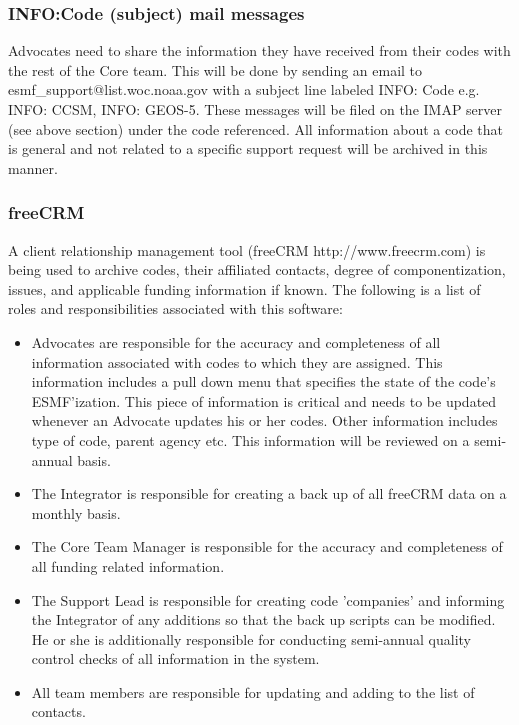 \subsubsection{INFO:Code (subject) mail messages}
\label{infomail}

Advocates need to share the information they have received from their codes with the rest 
of the Core team. This will be done by sending an email to esmf\_support@list.woc.noaa.gov with a 
subject line labeled INFO: Code e.g. INFO: CCSM, INFO: GEOS-5. These messages will be 
filed on the IMAP server (see above section) under the code referenced. All information 
about a code that is general and not related to a specific support request will be archived 
in this manner. 

\subsubsection{freeCRM}
A client relationship management tool (freeCRM http://www.freecrm.com) is being used 
to archive codes, their affiliated contacts, degree of componentization, issues, and 
applicable funding information if known. The following is a list of roles and 
responsibilities associated with this software:
\begin{itemize}
\item Advocates are responsible for the accuracy and completeness of all information 
associated with codes to which they are assigned.  This information includes a pull 
down menu that specifies the state of the code's ESMF'ization. This piece of 
information is critical and needs to be updated whenever an Advocate updates his or 
her codes. Other information includes type of code, parent agency etc. This 
information will be reviewed on a semi-annual basis. 
\item The Integrator is responsible for creating a back up of all freeCRM data on a 
monthly basis.
\item The Core Team Manager is responsible for the accuracy and completeness of all 
funding related information.
\item The Support Lead is responsible for creating code 'companies' and informing 
the Integrator of any additions so that the back up scripts can be modified. He or 
she is additionally responsible for conducting semi-annual quality control checks of 
all information in the system. 
\item All team members are responsible for updating and adding to the list of 
contacts. 
\end{itemize} 

